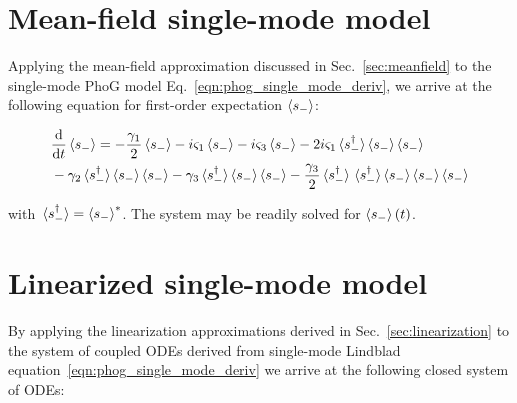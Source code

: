 \clearpage
\section{Mean-field single-mode model}\label{appendix:single_mode_mean_field}
Applying the mean-field approximation discussed in Sec.~\ref{sec:meanfield} to the single-mode PhoG model Eq.~\ref{eqn:phog_single_mode_deriv}, we arrive at the following equation for first-order expectation $\ev{s_-}$:

\begin{align}
&\ddt \ev{s_-} = - \frac{\gamma_1}{2} \ev{s_-} - i \varsigma_1 \ev{s_-} - i \varsigma_3 \ev{s_-} - 2 i \varsigma_1 \ev*{s_-^\dagger} \ev{s_-} \ev{s_-}  \notag \\
%
&- \gamma_2 \ev*{s_-^\dagger} \ev{s_-} \ev{s_-} - \gamma_3 \ev*{s_-^\dagger} \ev{s_-} \ev{s_-} - \frac{\gamma_3}{2} \ev*{s_-^\dagger} \ev*{s_-^\dagger} \ev{s_-} \ev{s_-} \ev{s_-}
\end{align}

\noindent with $\ev*{s_-^\dagger} = \ev{s_-}^*$. The system may be readily solved for $\ev{s_-}\left(t\right)$.

\section{Linearized single-mode model}\label{appendix:single_mode_linear}
By applying the linearization approximations derived in Sec.~\ref{sec:linearization} to the system of coupled ODEs derived from single-mode Lindblad equation~\ref{eqn:phog_single_mode_deriv} we arrive at the following closed system of ODEs:


